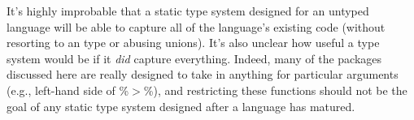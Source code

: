 \documentclass[acmsmall,10pt,review,anonymous]{acmart}\settopmatter{printfolios=true,printccs=false,printacmref=false}
\begin{document}
It's highly improbable that a static type system designed for an untyped language will be able to capture all of the language's existing code (without resorting to an \ANY type or abusing unions).
It's also unclear how useful a type system would be if it {\it did} capture everything.
Indeed, many of the packages discussed here are really designed to take in anything for particular arguments (e.g., left-hand side of \%$>$\%), and restricting these functions should not be the goal of any static type system designed after a language has matured.


\end{document}
